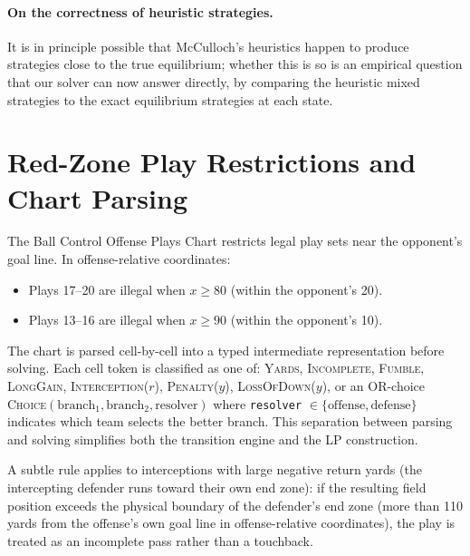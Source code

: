 \documentclass[11pt,letterpaper]{article}
\begin{document}
\paragraph{On the correctness of heuristic strategies.}
It is in principle possible that McCulloch's heuristics happen to produce strategies close
to the true equilibrium; whether this is so is an empirical question that our solver can
now answer directly, by comparing the heuristic mixed strategies to the exact equilibrium
strategies at each state.

\section{Red-Zone Play Restrictions and Chart Parsing}
\label{sec:redzone}

The Ball Control Offense Plays Chart restricts legal play sets near the opponent's goal
line.  In offense-relative coordinates:

\begin{itemize}
  \item Plays 17--20 are illegal when $x \geq 80$ (within the opponent's 20).
  \item Plays 13--16 are illegal when $x \geq 90$ (within the opponent's 10).
\end{itemize}

The chart is parsed cell-by-cell into a typed intermediate representation before solving.
Each cell token is classified as one of: \textsc{Yards}, \textsc{Incomplete},
\textsc{Fumble}, \textsc{LongGain}, \textsc{Interception}($r$), \textsc{Penalty}($y$),
\textsc{LossOfDown}($y$), or an OR-choice \textsc{Choice}$(\text{branch}_1,
\text{branch}_2, \text{resolver})$ where \texttt{resolver} $\in \{\text{offense},
\text{defense}\}$ indicates which team selects the better branch.  This separation between
parsing and solving simplifies both the transition engine and the LP construction.

A subtle rule applies to interceptions with large negative return yards (the intercepting
defender runs toward their own end zone): if the resulting field position exceeds the
physical boundary of the defender's end zone (more than 110 yards from the offense's own
goal line in offense-relative coordinates), the play is treated as an incomplete pass
rather than a touchback.

\end{document}
